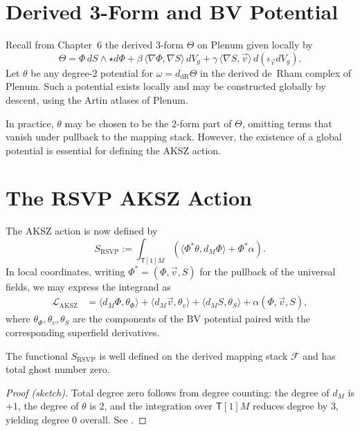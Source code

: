 \section{Derived 3-Form and BV Potential}

Recall from Chapter~6 the derived $3$-form $\Theta$ on $\mathrm{Plenum}$
given locally by
\[
\Theta =
\Phi\, dS\wedge \star d\Phi
+ \beta\, \langle\nabla\Phi,\nabla S\rangle\, dV_g
+ \gamma\, \langle\nabla S,\vec v\rangle\, d(\iota_{\vec v}dV_g).
\]
Let $\theta$ be any degree-$2$ potential for $\omega=d_{\mathrm{dR}}\Theta$
in the derived de~Rham complex of $\mathrm{Plenum}$. Such a potential
exists locally and may be constructed globally by descent, using the
Artin atlases of $\mathrm{Plenum}$.

\begin{remark}
In practice, $\theta$ may be chosen to be the $2$-form part of $\Theta$,
omitting terms that vanish under pullback to the mapping stack.
However, the existence of a global potential is essential for defining
the AKSZ action.
\end{remark}


\section{The RSVP AKSZ Action}
\label{sec:theta}

The AKSZ action is now defined by
\begin{equation}
\label{eq:RSVP-AKSZ}
S_{\mathrm{RSVP}}
:= \int_{\mathsf{T}[1]M}
\left(
\langle \Phi^{\ast}\theta, d_M\Phi\rangle
+ \Phi^{\ast}\alpha
\right).
\end{equation}
In local coordinates, writing $\Phi^{\ast}=(\Phi,\vec v,S)$ for the
pullback of the universal fields, we may express the integrand as
\begin{align}
\mathcal{L}_{\mathrm{AKSZ}}
&=
\langle d_M\Phi, \theta_{\Phi}\rangle
+ \langle d_M \vec v, \theta_{v}\rangle
+ \langle d_M S, \theta_{S}\rangle
+ \alpha(\Phi,\vec v,S),
\end{align}
where $\theta_{\Phi},\theta_{v},\theta_{S}$ are the components of the BV
potential paired with the corresponding superfield derivatives.

\begin{proposition}
The functional $S_{\mathrm{RSVP}}$ is well defined on the derived
mapping stack $\mathcal{F}$ and has total ghost number zero.
\end{proposition}

\begin{proof}[Proof (sketch)]
Total degree zero follows from degree counting: the degree of
$d_M$ is $+1$, the degree of $\theta$ is $2$, and the integration over
$\mathsf{T}[1]M$ reduces degree by $3$, yielding degree $0$ overall.
See \cite{AKSZ97,CF07}.
\end{proof}

